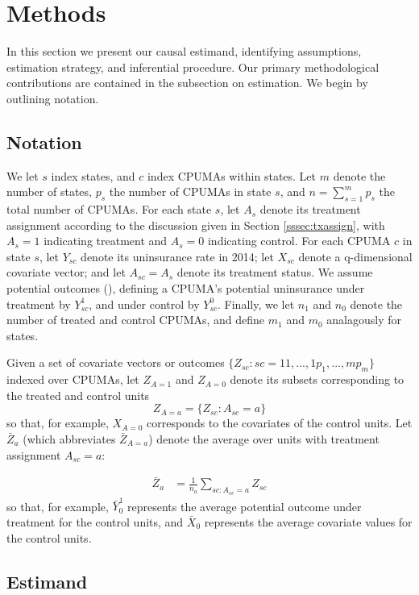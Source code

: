 \documentclass[aoas]{imsart}
\theoremstyle{plain}
\theoremstyle{remark}
\begin{document}
\section{Methods}\label{sec:methods}

In this section we present our causal estimand, identifying assumptions, estimation strategy, and inferential procedure. Our primary methodological contributions are contained in the subsection on estimation. We begin by outlining notation.

\subsection{Notation}
We let $s$ index states, and $c$ index CPUMAs within states. Let $m$ denote the number of states, $p_s$  the number of CPUMAs in state $s$, and $n = \sum_{s=1}^m p_s$ the total number of CPUMAs. For each state $s$, let $A_s$ denote its treatment assignment according to the discussion given in Section \ref{sssec:txassign}, with $A_s = 1$ indicating treatment and $A_s=0$ indicating control. For each CPUMA $c$ in state $s$, let $Y_{sc}$ denote its uninsurance rate in 2014; let $X_{sc}$ denote a q-dimensional covariate vector; and let $A_{sc} = A_{s}$ denote its treatment status. We assume potential outcomes (\cite{rubin2005causal}), defining a CPUMA's potential uninsurance under treatment by $Y^1_{sc}$, and under control by $Y^0_{sc}$. Finally, we let $n_1$ and $n_0$ denote the number of treated and control CPUMAs, and define $m_1$ and $m_0$ analagously for states.

Given a set of covariate vectors or outcomes $\{Z_{sc}: sc = 11, ..., 1p_1, ..., mp_m\}$ indexed over CPUMAs, let $Z_{A=1}$ and $Z_{A=0}$ denote its subsets corresponding to the treated and control units
\[ Z_{A=a} = \{Z_{sc}: A_{sc}=a\}\]
so that, for example, $X_{A=0}$ corresponds to the covariates of the control units. Let $\bar{Z}_a$ (which abbreviates $\bar{Z}_{A=a}$) denote the average over units with treatment assignment $A_{sc} = a$:

\begin{align*}
	\bar{Z}_a & = \frac{1}{n_a} \sum_{sc: A_{sc}=a} Z_{sc}
\end{align*}
so that, for example, $\bar{Y}_0^1$ represents the average potential outcome under treatment for the control units, and $\bar{X}_0$ represents the average covariate values for the control units.

\subsection{Estimand} \label{ssec:estimand}
\end{document}
